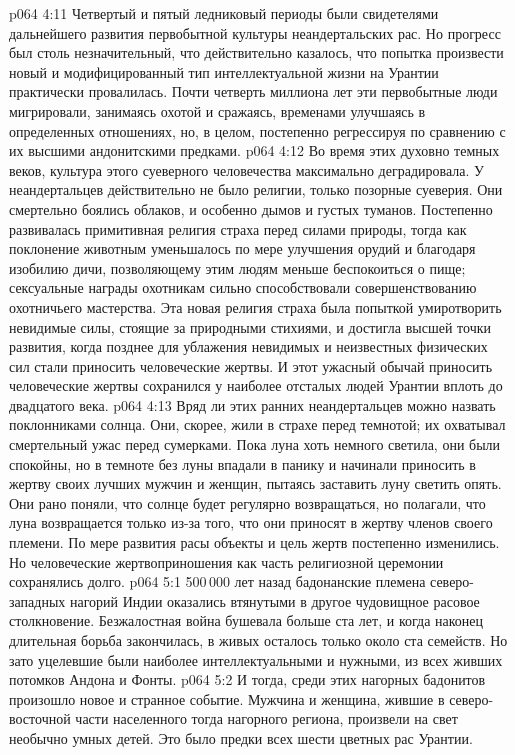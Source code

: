 \vs p064 4:11 Четвертый и пятый ледниковый периоды были свидетелями дальнейшего развития первобытной культуры неандертальских рас. Но прогресс был столь незначительный, что действительно казалось, что попытка произвести новый и модифицированный тип интеллектуальной жизни на Урантии практически провалилась. Почти четверть миллиона лет эти первобытные люди мигрировали, занимаясь охотой и сражаясь, временами улучшаясь в определенных отношениях, но, в целом, постепенно регрессируя по сравнению с их высшими андонитскими предками.
\vs p064 4:12 \pc Во время этих духовно темных веков, культура этого суеверного человечества максимально деградировала. У неандертальцев действительно не было религии, только позорные суеверия. Они смертельно боялись облаков, и особенно дымов и густых туманов. Постепенно развивалась примитивная религия страха перед силами природы, тогда как поклонение животным уменьшалось по мере улучшения орудий и благодаря изобилию дичи, позволяющему этим людям меньше беспокоиться о пище; сексуальные награды охотникам сильно способствовали совершенствованию охотничьего мастерства. Эта новая религия страха была попыткой умиротворить невидимые силы, стоящие за природными стихиями, и достигла высшей точки развития, когда позднее для ублажения невидимых и неизвестных физических сил стали приносить человеческие жертвы. И этот ужасный обычай приносить человеческие жертвы сохранился у наиболее отсталых людей Урантии вплоть до двадцатого века.
\vs p064 4:13 Вряд ли этих ранних неандертальцев можно назвать поклонниками солнца. Они, скорее, жили в страхе перед темнотой; их охватывал смертельный ужас перед сумерками. Пока луна хоть немного светила, они были спокойны, но в темноте без луны впадали в панику и начинали приносить в жертву своих лучших мужчин и женщин, пытаясь заставить луну светить опять. Они рано поняли, что солнце будет регулярно возвращаться, но полагали, что луна возвращается только из\hyp{}за того, что они приносят в жертву членов своего племени. По мере развития расы объекты и цель жертв постепенно изменились. Но человеческие жертвоприношения как часть религиозной церемонии сохранялись долго.
\vs p064 5:1 500\,000 лет назад бадонанские племена северо\hyp{}западных нагорий Индии оказались втянутыми в другое чудовищное расовое столкновение. Безжалостная война бушевала больше ста лет, и когда наконец длительная борьба закончилась, в живых осталось только около ста семейств. Но зато уцелевшие были наиболее интеллектуальными и нужными, из всех живших потомков Андона и Фонты.
\vs p064 5:2 И тогда, среди этих нагорных бадонитов произошло новое и странное событие. Мужчина и женщина, жившие в северо\hyp{}восточной части населенного тогда нагорного региона,  произвели на свет необычно умных детей. Это было  предки всех шести цветных рас Урантии.
